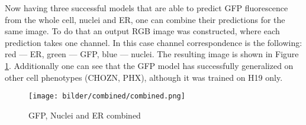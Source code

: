Now having three successful models that are able to predict GFP fluorescence from the whole cell, nuclei and ER, one can combine their predictions for the same image. To do that an output RGB image was constructed, where each prediction takes one channel. In this case channel correspondence is the following: red --- ER, green --- GFP, blue --- nuclei. The resulting image is shown in Figure \ref{fig:combined}. Additionally one can see that the GFP model has successfully generalized on other cell phenotypes (CHOZN, PHX), although it was trained on H19 only.
\begin{figure}[htb]
	\begin{center}
		\texttt{[image: bilder/combined/combined.png]}
		\caption{GFP, Nuclei and ER combined}\label{fig:combined}
	\end{center}
\end{figure}
